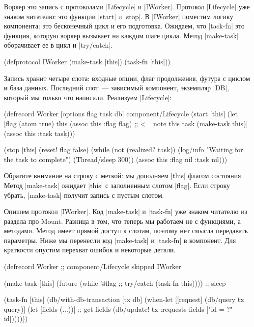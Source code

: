 Воркер это запись с протоколами \spverb|Lifecycle| и \spverb|IWorker|. Протокол
\spverb|Lifecycle| уже знаком читателю: это функции \spverb|start| и
\spverb|stop|. В \spverb|IWorker| поместим логику компонента: это бесконечный
цикл и его подготовка. Ожидаем, что \spverb|task-fn| это функция, которую воркер
вызывает на каждом шаге цикла. Метод \spverb|make-task| оборачивает ее в цикл и
\spverb|try/catch|.

\begin{english}
  \begin{clojure}
(defprotocol IWorker
  (make-task [this])
  (task-fn [this]))
  \end{clojure}
\end{english}

Запись хранит четыре слота: входные опции, флаг продолжения, футура с циклом и
база данных. Последний слот~--- зависимый компонент, экземпляр \spverb|DB|,
который мы только что написали. Реализуем \spverb|Lifecycle|:

\begin{english}
  \begin{clojure}
(defrecord Worker
  [options flag task db]
  component/Lifecycle
  (start [this]
    (let [flag (atom true)
          this (assoc this :flag flag) ;; <= note this
          task (make-task this)]
      (assoc this :task task)))

  (stop [this]
    (reset! flag false)
    (while (not (realized? task))
      (log/info "Waiting for the task to complete")
      (Thread/sleep 300))
    (assoc this :flag nil :task nil)))
  \end{clojure}
\end{english}

Обратите внимание на строку с меткой: мы дополняем \spverb|this| флагом
состояния. Метод \spverb|make-task| ожидает \spverb|this| с заполненным слотом
\spverb|flag|. Если строку убрать, \spverb|make-task| получит запись с пустым
слотом.

Опишем протокол \spverb|IWorker|. Код \spverb|make-task| и \spverb|task-fn| уже
знаком читателю из раздела про Mount. Разница в том, что теперь мы работаем не с
функциями, а методами. Метод имеет прямой доступ к слотам, поэтому нет смысла
передавать параметры. Ниже мы перенесли код \spverb|make-task| и
\spverb|task-fn| в компонент. Для краткости опустим перехват ошибок и некоторые
детали.

\begin{english}
  \begin{clojure}
(defrecord Worker
  ;; component/Lifecycle skipped
  IWorker

  (make-task [this]
    (future
      (while @flag ;; try/catch
        (task-fn this)))) ;; sleep

  (task-fn [this]
    (db/with-db-transaction [tx db]
      (when-let [[request] (db/query tx query)]
        (let [fields (...))] ;; get fields
          (db/update! tx :requests
                      fields ["id = ?" id]))))))
  \end{clojure}
\end{english}

